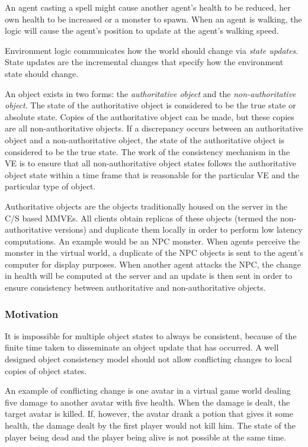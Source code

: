 An agent casting a spell might cause another agent's health to be reduced, her own health to be increased or a monster to spawn. When an agent is walking, the logic will cause the agent's position to update at the agent's walking speed.

Environment logic communicates how the world should change via \emph{state updates}. State updates are the incremental changes that specify how the environment state should change.

An object exists in two forms: the \emph{authoritative object} and the \emph{non-authoritative object}. The state of the authoritative object is considered to be the true state or absolute state. Copies of the authoritative object can be made, but these copies are all non-authoritative objects. If a discrepancy occurs between an authoritative object and a non-authoritative object, the state of the authoritative object is considered to be the true state. The work of the consistency mechanism in the VE is to ensure that all non-authoritative object states follows the authoritative object state within a time frame that is reasonable for the particular VE and the particular type of object.

Authoritative objects are the objects traditionally housed on the server in the C/S based MMVEs. All clients obtain replicas of these objects (termed the non-authoritative versions) and duplicate them locally in order to perform low latency computations. An example would be an NPC monster. When agents perceive the monster in the virtual world, a duplicate of the NPC objects is sent to the agent's computer for display purposes. When another agent attacks the NPC, the change in health will be computed at the server and an update is then sent in order to ensure consistency between authoritative and non-authoritative objects.

\subsubsection{Motivation}

It is impossible for multiple object states to always be consistent, because of the finite time taken to disseminate an object update that has occurred. A well designed object consistency model should not allow conflicting changes to local copies of object states.

An example of conflicting change is one avatar in a virtual game world dealing five damage to another avatar with five health. When the damage is dealt, the target avatar is killed. If, however, the avatar drank a potion that gives it some health, the damage dealt by the first player would not kill him. The state of the player being dead and the player being alive is not possible at the same time.

